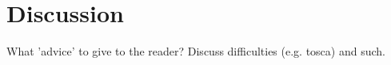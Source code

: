 \section{Discussion}
What 'advice' to give to the reader? Discuss difficulties (e.g. tosca) and such.